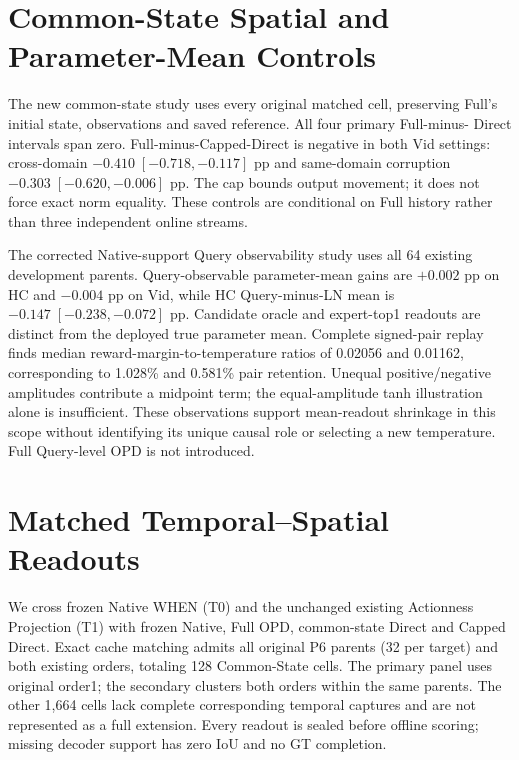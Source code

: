 \documentclass[11pt]{article}
\begin{document}
\section{Common-State Spatial and Parameter-Mean Controls}
The new common-state study uses every original matched cell, preserving Full's
initial state, observations and saved reference. All four primary Full-minus-
Direct intervals span zero. Full-minus-Capped-Direct is negative in both Vid
settings: cross-domain $-0.410\;[-0.718,-0.117]$ pp and same-domain corruption
$-0.303\;[-0.620,-0.006]$ pp. The cap bounds output movement; it does not force
exact norm equality. These controls are conditional on Full history rather
than three independent online streams.

The corrected Native-support Query observability study uses all 64 existing
development parents. Query-observable parameter-mean gains are $+0.002$ pp on
HC and $-0.004$ pp on Vid, while HC Query-minus-LN mean is
$-0.147\;[-0.238,-0.072]$ pp. Candidate oracle and expert-top1 readouts are
distinct from the deployed true parameter mean. Complete signed-pair replay
finds median reward-margin-to-temperature ratios of 0.02056 and 0.01162,
corresponding to 1.028\% and 0.581\% pair retention. Unequal positive/negative
amplitudes contribute a midpoint term; the equal-amplitude tanh illustration
alone is insufficient. These observations support mean-readout shrinkage in
this scope without identifying its unique causal role or selecting a new
temperature. Full Query-level OPD is not introduced.

\section{Matched Temporal--Spatial Readouts}
We cross frozen Native WHEN (T0) and the unchanged existing Actionness
Projection (T1) with frozen Native, Full OPD, common-state Direct and Capped
Direct. Exact cache matching admits all original P6 parents (32 per target)
and both existing orders, totaling 128 Common-State cells. The primary panel
uses original order1; the secondary clusters both orders within the same
parents. The other 1,664 cells lack complete corresponding temporal captures
and are not represented as a full extension. Every readout is sealed before
offline scoring; missing decoder support has zero IoU and no GT completion.
\end{document}
